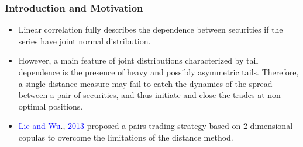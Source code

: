 \documentclass[pdf,9pt,xcolor=dvipsnames,hide notes]{beamer}
\begin{document}
	
	
	\begin{frame}[label=frame1c]
		\frametitle{Introduction and Motivation}
		
		\begin{itemize}
			\justifying
			
			\item Linear correlation fully describes the dependence between securities if the series have joint normal distribution. 
			
			\vspace{0.3cm}
			
			\item   However, a main feature of joint distributions characterized by tail dependence is the presence of heavy and possibly asymmetric tails. Therefore, a single distance measure may fail to catch the dynamics of the spread between a pair of securities, and thus initiate and close the trades at non-optimal positions.
			
			\vspace{0.3cm}
			
			\item \textcolor{blue}{Lie and Wu}., \textcolor{blue}{2013} proposed a pairs trading strategy based on 2-dimensional copulas to overcome the limitations of the distance method.
			
			\vspace{0.3cm}
			
%			
		\end{itemize}
		
	\end{frame}
	
%		
%			
%			
%			
%			
%		
\end{document}
